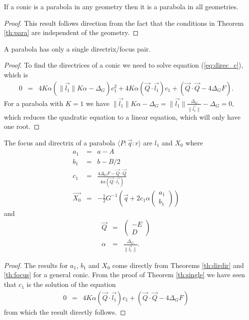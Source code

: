 \begin{corollary}
If a conic is a parabola in any geometry then it is a parabola in all geometries.
\end{corollary}
\begin{proof}
This result follows direction from the fact that the conditions in Theorem \ref{th:para} are independent of the geometry.
\end{proof}

\begin{theorem}\label{th:single}A parabola has only a single directrix/focus pair.
\end{theorem}
\begin{proof}
To find the directrices of a conic we need to solve equation (\ref{eq:direc_c}), which is
\begin{eqnarray*}
0 & = & 4K\alpha(\|\vec{l_1}\|K\alpha - \Delta_G )c_1^2 + 4K\alpha(\vec{Q}\cdot\vec{l_1})c_1 + (\vec{Q}\cdot\vec{Q} - 4\Delta_GF).
\end{eqnarray*}
For a parabola with $K=1$ we have $\|\vec{l_1}\|K\alpha - \Delta_G = \|\vec{l_1}\|\frac{\Delta_G}{\|\vec{l_1}\|} - \Delta_G = 0$, which reduces the quadratic equation to a linear equation, which will only have one root.
\end{proof}

\begin{theorem} The focus and directrix of a parabola $\langle P\!:\!\vec{q}\!:\!r\rangle$ are $l_1$ and $X_0$ where 
\begin{eqnarray}
a_1 & = & a - A\\
b_1 & = & b - B/2\\
c_1 & = & \frac{4\Delta_GF - \vec{Q}\cdot\vec{Q}}{4\alpha(\vec{Q}\cdot\vec{l_1})}\\
\vec{X_0} & = &  -\frac{1}{2}G^{-1}\left(\vec{q} + 2c_1\alpha\begin{pmatrix}a_1 \\ b_1\end{pmatrix} \right)
\end{eqnarray}
and
\begin{eqnarray}
\vec{Q} & = & \begin{pmatrix} -E \\ D \end{pmatrix}\\
\alpha & = & \frac{\Delta_G}{\|\vec{l_1}\|}.
\end{eqnarray}
\end{theorem}
\begin{proof}
The results for $a_1$, $b_1$ and $X_0$ come directly from Theorems \ref{th:dirdir} and \ref{th:focus} for a general conic.
From the proof of Theorem \ref{th:single} we have seen that $c_1$ is the solution of the equation
\begin{eqnarray*}
0 & = & 4K\alpha(\vec{Q}\cdot\vec{l_1})c_1 + (\vec{Q}\cdot\vec{Q} - 4\Delta_GF)
\end{eqnarray*}
from which the result directly follows.
\end{proof}

